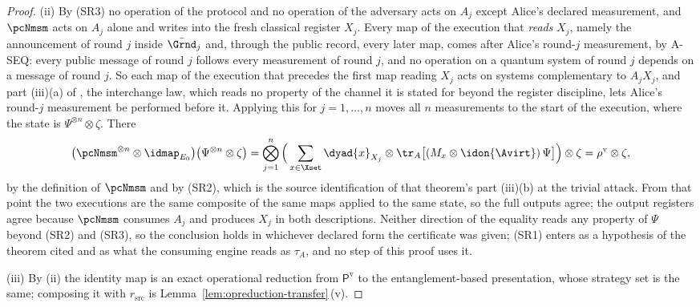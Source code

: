 \begin{proof}
(ii) By (SR3) no operation of the protocol and no operation of the adversary
acts on $A_j$ except Alice's declared measurement, and $\pcNmsm$ acts on $A_j$
alone and writes into the fresh classical register $X_j$. Every map of the
execution that \emph{reads} $X_j$, namely the announcement of round $j$ inside
$\bar{\Grnd}_j$ and, through the public record, every later map, comes after
Alice's round-$j$ measurement, by A-SEQ: every public message of round $j$
follows every measurement of round $j$, and no operation on a quantum system of
round $j$ depends on a message of round $j$. So each map of the execution that
precedes the first map reading $X_j$ acts on systems complementary to $A_jX_j$,
and part (iii)(a) of , the
interchange law, which reads no property of the channel it is stated for
beyond the register discipline, lets Alice's round-$j$ measurement be
performed before it. Applying this for $j=1,\dots,n$ moves all $n$
measurements to the start of the execution, where the state is
$\Psi^{\otimes n}\otimes\zeta$. There
\begin{equation*}
  \big(\pcNmsm^{\otimes n}\otimes\idmap_{E_0}\big)
  \big(\Psi^{\otimes n}\otimes\zeta\big)
  =\bigotimes_{j=1}^{n}\Big(\sum_{x\in\Xset}\dyad{x}_{X_j}\otimes
    \tr_{A}\big[(M_x\otimes\idon{\Avirt})\,\Psi\big]\Big)\otimes\zeta
  =\rho^{\mathrm{v}}\otimes\zeta ,
\end{equation*}
by the definition of $\pcNmsm$ and by (SR2), which is the source
identification of that theorem's part (iii)(b) at the trivial attack. From that
point the two executions are the same composite of the same maps applied to the
same state, so the full outputs agree; the output registers agree because
$\pcNmsm$ consumes $A_j$ and produces $X_j$ in both descriptions. Neither
direction of the equality reads any property of $\Psi$ beyond (SR2) and (SR3),
so the conclusion holds in whichever declared form the certificate was given;
(SR1) enters as a hypothesis of the theorem cited and as what the consuming
engine reads as $\tau_A$, and no step of this proof uses it.

(iii) By (ii) the identity map is an exact operational reduction from
$\mathsf{P}^{\mathrm{v}}$ to the entanglement-based presentation, whose strategy
set is the same; composing it with $r_{\mathrm{src}}$ is
Lemma~\ref{lem:opreduction-transfer}\,(v).


\end{proof}
